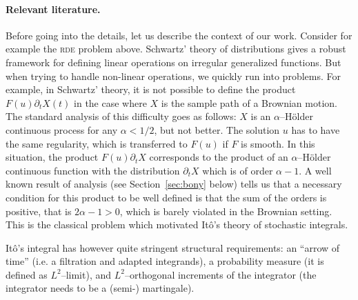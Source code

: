 \documentclass[a4paper,11pt]{article}
\newcommand{\mathd}{\mathrm{d}}
\theoremstyle{remark}
\begin{document}
\paragraph{Relevant literature.}


Before going into the details, let us describe the context of our work. Consider for example the \textsc{rde} problem above. 
Schwartz' theory of distributions gives a robust framework for defining linear operations on irregular generalized functions. But when trying to handle non-linear operations, we quickly run into problems. For example, in Schwartz' theory, it is not possible to define the product $F(u) \partial_t X(t)$ in the case where $X$ is the sample path of a Brownian motion. The standard analysis of this difficulty goes as follows: $X$ is an $\alpha$--H\"older continuous process for any $\alpha<1/2$, but not better. The solution $u$ has to have the same regularity, which is transferred to $F(u)$ if $F$ is smooth. In this situation, the product $F(u)\partial_t X$ corresponds to the product of an $\alpha$--H\"older continuous function with the distribution $\partial_t X$ which is of order $\alpha-1$. A well known result of analysis (see Section~\ref{sec:bony} below) tells us that a necessary condition for this product to be well defined is that the sum of the orders is positive, that is $2\alpha-1>0$, which is barely violated in the Brownian setting.
This is the classical problem which motivated It\^o's theory of stochastic integrals.

It\^{o}'s integral has however quite stringent structural requirements: an ``arrow of time'' (i.e. a filtration and adapted integrands), a probability measure (it is defined as $L^2$--limit), and $L^2$--orthogonal increments of the integrator (the integrator needs to be a (semi-) martingale).
\end{document}
